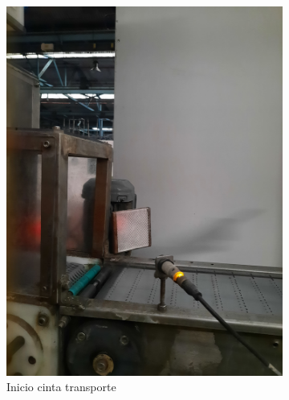 \documentclass[11pt]{memoir}
\begin{document}
\begin{figure}[H]
\begin{subfigure}{0.3\textwidth}
\centering
  \includegraphics[width = \textwidth, angle=270]{img/closeup}
  \caption{Inicio cinta transporte}
  \label{fig:inicio}
\end{subfigure}\hfill
\begin{subfigure}{0.3\textwidth}
\centering

\end{subfigure}
\end{figure}
\end{document}
